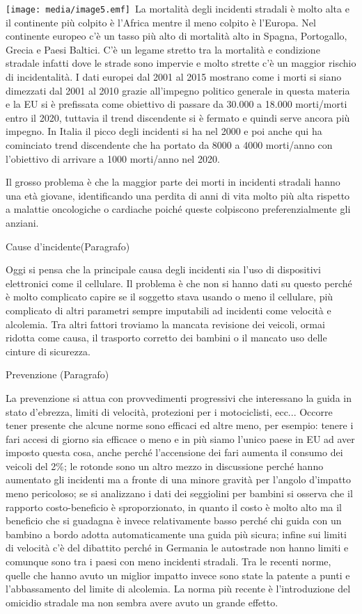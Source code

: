 \documentclass[]{article}
\begin{document}
\texttt{[image: media/image5.emf]}~La
mortalità degli incidenti stradali è molto alta e il continente più
colpito è l'Africa mentre il meno colpito è l'Europa. Nel continente
europeo c'è un tasso più alto di mortalità alto in Spagna, Portogallo,
Grecia e Paesi Baltici. C'è un legame stretto tra la mortalità e
condizione stradale infatti dove le strade sono impervie e molto strette
c'è un maggior rischio di incidentalità. I dati europei dal 2001 al 2015
mostrano come i morti si siano dimezzati dal 2001 al 2010 grazie
all'impegno politico generale in questa materia e la EU si è prefissata
come obiettivo di passare da 30.000 a 18.000 morti/morti entro il 2020,
tuttavia il trend discendente si è fermato e quindi serve ancora più
impegno. In Italia il picco degli incidenti si ha nel 2000 e poi anche
qui ha cominciato trend discendente che ha portato da 8000 a 4000
morti/anno con l'obiettivo di arrivare a 1000 morti/anno nel 2020.

Il grosso problema è che la maggior parte dei morti in incidenti
stradali hanno una età giovane, identificando una perdita di anni di
vita molto più alta rispetto a malattie oncologiche o cardiache poiché
queste colpiscono preferenzialmente gli anziani.

Cause d'incidente(Paragrafo)

Oggi si pensa che la principale causa degli incidenti sia l'uso di
dispositivi elettronici come il cellulare. Il problema è che non si
hanno dati su questo perché è molto complicato capire se il soggetto
stava usando o meno il cellulare, più complicato di altri parametri
sempre imputabili ad incidenti come velocità e alcolemia. Tra altri
fattori troviamo la mancata revisione dei veicoli, ormai ridotta come
causa, il trasporto corretto dei bambini o il mancato uso delle cinture
di sicurezza.

Prevenzione (Paragrafo)

La prevenzione si attua con provvedimenti progressivi che interessano la
guida in stato d'ebrezza, limiti di velocità, protezioni per i
motociclisti, ecc... Occorre tener presente che alcune norme sono
efficaci ed altre meno, per esempio: tenere i fari accesi di giorno sia
efficace o meno e in più siamo l'unico paese in EU ad aver imposto
questa cosa, anche perché l'accensione dei fari aumenta il consumo dei
veicoli del 2\%; le rotonde sono un altro mezzo in discussione perché
hanno aumentato gli incidenti ma a fronte di una minore gravità per
l'angolo d'impatto meno pericoloso; se si analizzano i dati dei
seggiolini per bambini si osserva che il rapporto costo-beneficio è
sproporzionato, in quanto il costo è molto alto ma il beneficio che si
guadagna è invece relativamente basso perché chi guida con un bambino a
bordo adotta automaticamente una guida più sicura; infine sui limiti di
velocità c'è del dibattito perché in Germania le autostrade non hanno
limiti e comunque sono tra i paesi con meno incidenti stradali. Tra le
recenti norme, quelle che hanno avuto un miglior impatto invece sono
state la patente a punti e l'abbassamento del limite di alcolemia. La
norma più recente è l'introduzione del omicidio stradale ma non sembra
avere avuto un grande effetto.
\end{document}
